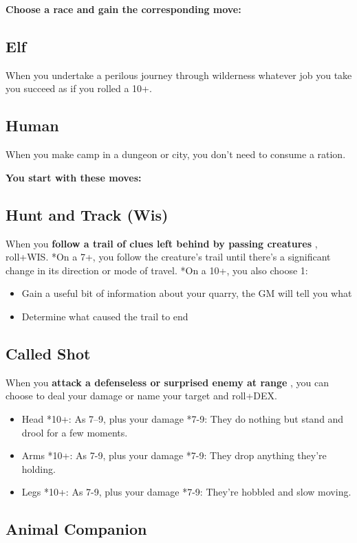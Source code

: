 {\bfseries Choose a race and gain the corresponding move:}
\subsection{Elf}


 When you undertake a perilous journey through wilderness whatever job you take you succeed as if you rolled a 10+.
\subsection{Human}


 When you make camp in a dungeon or city, you don't need to consume a ration.


\vspace{\baselineskip}
{\bfseries You start with these moves:}
\subsection{Hunt and Track (Wis)}


 When you \textbf{follow a trail of clues left behind by passing creatures}
, roll+WIS. *On a 7+, you follow the creature's trail until there's a significant change in its direction or mode of travel. *On a 10+, you also choose 1:
\begin{itemize}
\item Gain a useful bit of information about your quarry, the GM will tell you what
\item Determine what caused the trail to end

\end{itemize}
\subsection{Called Shot}


 When you \textbf{attack a defenseless or surprised enemy at range}
, you can choose to deal your damage or name your target and roll+DEX.
\begin{itemize}
\item Head *10+: As 7--9, plus your damage *7-9: They do nothing but stand and drool for a few moments.
\item Arms *10+: As 7-9, plus your damage *7-9: They drop anything they're holding.
\item Legs *10+: As 7-9, plus your damage *7-9: They're hobbled and slow moving.

\end{itemize}
\subsection{Animal Companion}


